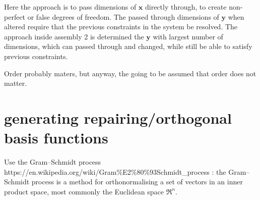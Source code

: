 \documentclass[a4paper,10pt]{article}
\begin{document}
Here the approach is to pass dimensions of $\mathbf{x}$ directly through, to create non-perfect or false degrees of freedom.
The passed through dimensions of $\mathbf{y}$ when altered require that the previous constraints in the system be resolved.
The approach inside assembly 2 is determined the $\mathbf{y}$ with largest number of dimensions, which can passed through and changed, while still be able to satisfy previous constraints.

Order probably maters, but anyway, the going to be assumed that order does not matter.

\section{generating repairing/orthogonal basis functions}

Use the Gram–Schmidt process https://en.wikipedia.org/wiki/Gram\%E2\%80\%93Schmidt\_process :
the Gram–Schmidt process is a method for orthonormalising a set of vectors in an inner product space, most commonly the Euclidean space $\Re^n$.
\end{document}
